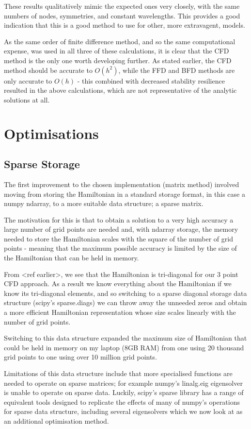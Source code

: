 These results qualitatively mimic the expected ones very closely, with the same numbers of nodes, symmetries, and constant wavelengths. This provides a good indication that this is a good method to use for other, more extravagent, models.

As the same order of finite difference method, and so the same computational expense, was used in all three of these calculations, it is clear that the CFD method is the only one worth developing further. As stated earlier, the CFD method should be accurate to $O(h^{2})$, while the FFD and BFD methods are only accurate to $O(h)$ - this combined with decreased stability resilience resulted in the above calculations, which are not representative of the analytic solutions at all.

\section{Optimisations}

\subsection{Sparse Storage}
The first improvement to the chosen implementation (matrix method) involved moving from storing the Hamiltonian in a standard storage format, in this case a numpy ndarray, to a more suitable data structure; a sparse matrix. 

The motivation for this is that to obtain a solution to a very high accuracy a large number of grid points are needed and, with ndarray storage, the memory needed to store the Hamiltonian scales with the square of the number of grid points - meaning that the maximum possible accuracy is limited by the size of the Hamiltonian that can be held in memory. 

From <ref earlier>, we see that the Hamiltonian is tri-diagonal for our 3 point CFD approach. As a result we know everything about the Hamiltonian if we know its tri-diagonal elements, and so switching to a sparse diagonal storage data structure (scipy's sparse.diags) we can throw away the unneeded zeros and obtain a more efficient Hamiltonian representation whose size scales linearly with the number of grid points. 

Switching to this data structure expanded the maximum size of Hamiltonian that could be held in memory on my laptop (8GB RAM) from one using 20 thousand grid points to one using over 10 million grid points.

Limitations of this data structure include that more specialised functions are needed to operate on sparse matrices; for example numpy's linalg.eig eigensolver is unable to operate on sparse data. Luckily, scipy's sparse library has a range of equivalent tools designed to replicate the effects of many of numpy's operations for sparse data structure, including several eigensolvers which we now look at as an additional optimisation method.

